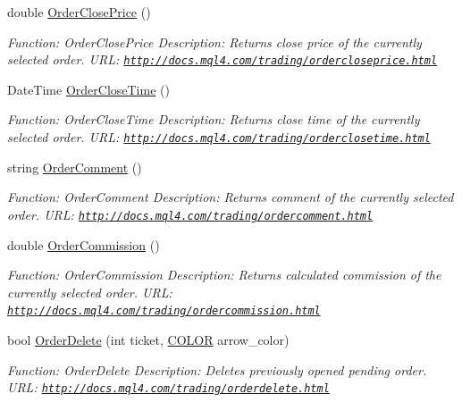 \begin{DoxyCompactItemize}
double \hyperlink{class_m_q_l4_c_sharp_1_1_base_1_1_m_q_l_base_aa3c87e720db97994d8dd3177ae063274}{Order\+Close\+Price} ()
\begin{DoxyCompactList}\small\item\em Function\+: Order\+Close\+Price Description\+: Returns close price of the currently selected order. U\+RL\+: \href{http://docs.mql4.com/trading/ordercloseprice.html}{\tt http\+://docs.\+mql4.\+com/trading/ordercloseprice.\+html} \end{DoxyCompactList}\item 
Date\+Time \hyperlink{class_m_q_l4_c_sharp_1_1_base_1_1_m_q_l_base_a069053d8f75f3b8fff8ab5e161ecda4e}{Order\+Close\+Time} ()
\begin{DoxyCompactList}\small\item\em Function\+: Order\+Close\+Time Description\+: Returns close time of the currently selected order. U\+RL\+: \href{http://docs.mql4.com/trading/orderclosetime.html}{\tt http\+://docs.\+mql4.\+com/trading/orderclosetime.\+html} \end{DoxyCompactList}\item 
string \hyperlink{class_m_q_l4_c_sharp_1_1_base_1_1_m_q_l_base_a9e37c44510927dc675ab96027661f95a}{Order\+Comment} ()
\begin{DoxyCompactList}\small\item\em Function\+: Order\+Comment Description\+: Returns comment of the currently selected order. U\+RL\+: \href{http://docs.mql4.com/trading/ordercomment.html}{\tt http\+://docs.\+mql4.\+com/trading/ordercomment.\+html} \end{DoxyCompactList}\item 
double \hyperlink{class_m_q_l4_c_sharp_1_1_base_1_1_m_q_l_base_a8040f892be4eff7b67888092225f5ca9}{Order\+Commission} ()
\begin{DoxyCompactList}\small\item\em Function\+: Order\+Commission Description\+: Returns calculated commission of the currently selected order. U\+RL\+: \href{http://docs.mql4.com/trading/ordercommission.html}{\tt http\+://docs.\+mql4.\+com/trading/ordercommission.\+html} \end{DoxyCompactList}\item 
bool \hyperlink{class_m_q_l4_c_sharp_1_1_base_1_1_m_q_l_base_aa7727740ea8ad8eb96024b77d80d701f}{Order\+Delete} (int ticket, \hyperlink{namespace_m_q_l4_c_sharp_1_1_base_1_1_enums_a79b99235c71c70f2f5207aac2ff24f1a}{C\+O\+L\+OR} arrow\+\_\+color)
\begin{DoxyCompactList}\small\item\em Function\+: Order\+Delete Description\+: Deletes previously opened pending order. U\+RL\+: \href{http://docs.mql4.com/trading/orderdelete.html}{\tt http\+://docs.\+mql4.\+com/trading/orderdelete.\+html} \end{DoxyCompactList}\item 

\end{DoxyCompactItemize}
